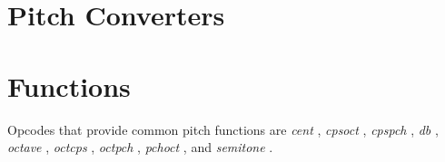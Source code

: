 \begin{comment}
\documentclass[10pt]{article}
\usepackage{fullpage, graphicx, url}
\setlength{\parskip}{1ex}
\setlength{\parindent}{0ex}
\title{Pitch Converters}



\begin{tabular}{ccc}
The Alternative Csound Reference Manual & & \\
Previous & &Next

\end{tabular}

\end{comment}
\section{Pitch Converters}
\section{Functions}


  Opcodes that provide common pitch functions are \emph{cent}
, \emph{cpsoct}
, \emph{cpspch}
, \emph{db}
, \emph{octave}
, \emph{octcps}
, \emph{octpch}
, \emph{pchoct}
, and \emph{semitone}
. 


\begin{comment}
\begin{tabular}{lcr}
Previous &Home &Next \\
Slider Banks &Up &Tuning Opcodes

\end{tabular}



\end{comment}

